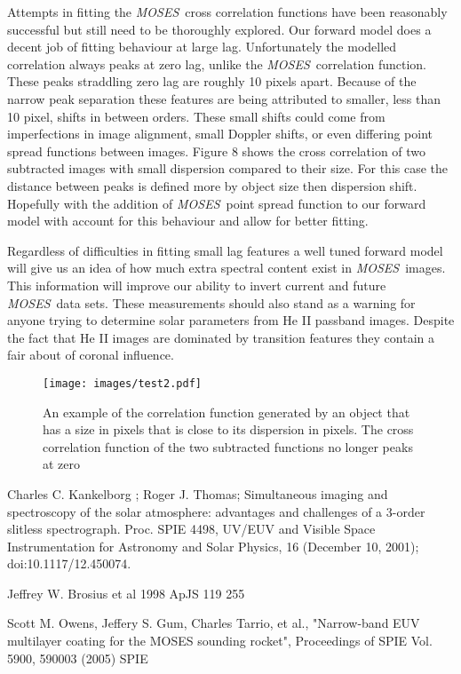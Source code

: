 \documentclass[]{aastex6}
\newcommand{\MOSES}{\textit{MOSES}}
\begin{document}
Attempts in fitting the \MOSES \ cross correlation functions have been reasonably successful but still need to be thoroughly explored.  Our forward model does a decent job of fitting behaviour at large lag.  Unfortunately the modelled correlation always peaks at zero lag, unlike the \MOSES \ correlation function.  These peaks straddling zero lag are roughly 10 pixels apart. Because of the narrow peak separation these features are being attributed to smaller, less than 10 pixel, shifts in between orders.  These small shifts could come from imperfections in image alignment, small Doppler shifts, or even differing point spread functions between images.  Figure 8 shows the cross correlation of two subtracted images with small dispersion compared to their size.  For this case the distance between peaks is defined more by object size then dispersion shift.  Hopefully with the addition of \MOSES \ point spread function to our forward model with account for this behaviour and allow for better fitting.

Regardless of difficulties in fitting small lag features a well tuned forward model will give us an idea of how much extra spectral content exist in \MOSES \ images.  This information will improve our ability to invert current and future \MOSES \ data sets.  These measurements should also stand as a warning for anyone trying to determine solar parameters from He II passband images.  Despite the fact that He II images are dominated by transition features they contain a fair about of coronal influence.



\begin{figure*}[t]
\centering
\texttt{[image: images/test2.pdf]}
\caption{An example of the correlation function generated by an object that has a size in pixels that is close to its dispersion in pixels.  The cross correlation function of the two subtracted functions no longer peaks at zero}
\end{figure*}	




\begin{thebibliography}{}

 Charles C. Kankelborg ; Roger J. Thomas; Simultaneous imaging and spectroscopy of the solar atmosphere: advantages and challenges of a 3-order slitless spectrograph. Proc. SPIE 4498, UV/EUV and Visible Space Instrumentation for Astronomy and Solar Physics, 16 (December 10, 2001); doi:10.1117/12.450074.

 Jeffrey W. Brosius et al 1998 ApJS 119 255

  Scott M. Owens, Jeffery S. Gum, Charles Tarrio, et al., "Narrow-band EUV multilayer coating for the MOSES sounding rocket", Proceedings of SPIE Vol. 5900, 590003 (2005)   SPIE 




\end{thebibliography}{}	
	
\end{document}
